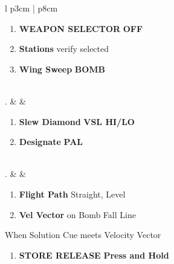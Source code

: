 \documentclass[8pt,usenames,dvipsnames,twoside]{article}
\begin{document}
\begin{center}
\begin{tabular}{l p{3cm} | p{8cm}}
\begin{minipage}[t]{\linewidth}
\begin{enumerate}[label=(\alph*)]
						\item \textbf{WEAPON SELECTOR} \dotfill \textbf{OFF}
						\item \textbf{Stations} \dotfill verify selected
						\item \textbf{Wing Sweep} \dotfill \textbf{BOMB}
					\end{enumerate} 
				\end{minipage} \\
				. &  &
				\begin{minipage}[t]{\linewidth}
					\vspace{-7pt}
					\begin{enumerate}[label=(\alph*)]
						\item \textbf{Slew Diamond} \dotfill \textbf{VSL HI/LO}
						\item \textbf{Designate} \dotfill \textbf{PAL}
					\end{enumerate}
				\end{minipage} \\
				. &  &
				\begin{minipage}[t]{\linewidth}
					\vspace{-7pt}
					\begin{enumerate}[label=(\alph*)]
						\item \textbf{Flight Path} \dotfill Straight, Level
						\item \textbf{Vel Vector} \dotfill on Bomb Fall Line
					\end{enumerate}
					When Solution Cue meets Velocity Vector
					\begin{enumerate}[label=(\alph*), resume]
						\item \textbf{STORE RELEASE} \dotfill \textbf{Press and Hold}
					\end{enumerate}
				\end{minipage} \\
				\bottomrule
			\end{tabular}
		\end{center}	
		
		\clearpage 
		
\end{document}
